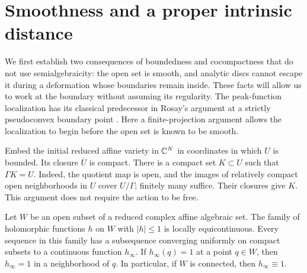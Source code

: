 \section{Smoothness and a proper intrinsic distance}\label{sec:geometry}

We first establish two consequences of boundedness and cocompactness that do
not use semialgebraicity: the open set is smooth, and analytic discs cannot
escape it during a deformation whose boundaries remain inside.  These facts
will allow us to work at the boundary without assuming its regularity.
The peak-function localization has its classical predecessor in Rosay's
argument at a strictly pseudoconvex boundary point
\cite[Section~3, Lemma~2]{Rosay1979}. Here a finite-projection argument
allows the localization to begin before the open set is known to be smooth.

Embed the initial reduced affine variety in $\mathbb C^N$ in coordinates in which
$U$ is bounded.  Its closure $\overline U$ is compact.  There is a compact set
$K\subset U$ such that $\Gamma K=U$.  Indeed, the quotient map is open, and
the images of relatively compact open neighborhoods in $U$ cover $U/\Gamma$;
finitely many suffice.  Their closures give $K$.  This argument does not
require the action to be free.

\begin{lemma}\label{lem:singular-montel}
Let $W$ be an open subset of a reduced complex affine algebraic set.  The
family of holomorphic functions $h$ on $W$ with $|h|\leq 1$ is locally
equicontinuous.  Every sequence in this family has a subsequence converging
uniformly on compact subsets to a continuous function $h_\infty$.
If $h_\infty(q)=1$ at a point $q\in W$, then $h_\infty=1$ in a neighborhood
of $q$.  In particular, if $W$ is connected, then $h_\infty\equiv 1$.
\end{lemma}

